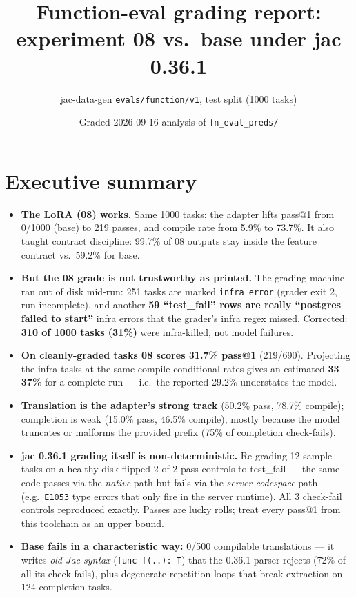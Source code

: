\documentclass[10pt,a4paper]{article}
\title{Function-eval grading report:\\experiment 08 vs.\ base under jac 0.36.1}
\author{jac-data-gen \texttt{evals/function/v1}, test split (1000 tasks)}
\date{Graded 2026-09-16 \;\textperiodcentered\; analysis of \texttt{fn\_eval\_preds/}}
\newcommand{\good}[1]{\textcolor{green!55!black}{#1}}
\newcommand{\bad}[1]{\textcolor{red!75!black}{#1}}
\newcommand{\warn}[1]{\textcolor{orange!85!black}{\textbf{#1}}}
\begin{document}
\maketitle
\vspace{-2.2em}

\section*{Executive summary}

\begin{itemize}
  \item \textbf{The LoRA (08) works.} Same 1000 tasks: the adapter lifts pass@1 from
        \bad{0/1000} (base) to \good{219 passes}, and compile rate from 5.9\% to
        \good{73.7\%}. It also taught contract discipline: 99.7\% of 08 outputs stay inside
        the feature contract vs.\ 59.2\% for base.
  \item \textbf{But the 08 grade is not trustworthy as printed.} The grading machine ran
        out of disk mid-run: 251 tasks are marked \texttt{infra\_error} (grader exit 2,
        run incomplete), and another \warn{59 ``test\_fail'' rows are really
        ``postgres failed to start''} infra errors that the grader's infra regex missed.
        Corrected: \textbf{310 of 1000 tasks (31\%)} were infra-killed, not model failures.
  \item \textbf{On cleanly-graded tasks 08 scores 31.7\% pass@1} (219/690). Projecting the
        infra tasks at the same compile-conditional rates gives an estimated
        \textbf{33--37\%} for a complete run --- i.e.\ the reported 29.2\% understates the model.
  \item \textbf{Translation is the adapter's strong track} (50.2\% pass, 78.7\% compile);
        completion is weak (15.0\% pass, 46.5\% compile), mostly because the model
        truncates or malforms the provided prefix (75\% of completion check-fails).
  \item \textbf{jac 0.36.1 grading itself is non-deterministic.} Re-grading 12 sample tasks
        on a healthy disk flipped 2 of 2 pass-controls to test\_fail --- the same code
        passes via the \emph{native} path but fails via the \emph{server codespace} path
        (e.g.\ \texttt{E1053} type errors that only fire in the server runtime).
        All 3 check-fail controls reproduced exactly. Passes are lucky rolls;
        treat every pass@1 from this toolchain as an upper bound.
  \item \textbf{Base fails in a characteristic way:} 0/500 compilable translations ---
        it writes \emph{old-Jac syntax} (\texttt{func f(..): T}) that the 0.36.1 parser
        rejects (72\% of all its check-fails), plus degenerate repetition loops that
        break extraction on 124 completion tasks.
\end{itemize}
\end{document}
